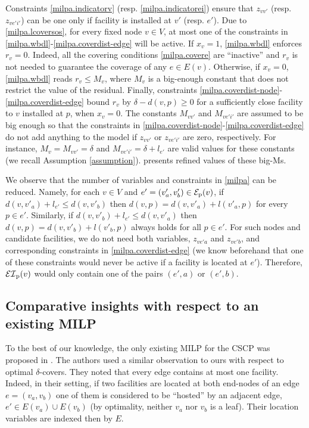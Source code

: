 Constraints \eqref{milpa.indicatorv} (resp. \eqref{milpa.indicatorei}) ensure that $z_{vv'}$ (resp. $z_{ve'i'}$) can be one only if  facility  is installed at $v'$ (resp. $e'$). Due to \eqref{milpa.lcoversos}, for every fixed node $v\in V$, at most one of the constraints in \eqref{milpa.wbdl}-\eqref{milpa.coverdist-edge} will be active. If $x_{v}=1$, \eqref{milpa.wbdl} enforces $r_{v}=0$. Indeed, all the covering conditions \eqref{milpa.covere} are ``inactive'' and $r_v$ is not needed to guarantee the coverage of any $e\in E(v)$. Otherwise, if $x_{v}=0$,  \eqref{milpa.wbdl} reads $r_{v}\leq M_v$, where $M_v$ is a big-enough constant that does not restrict the value of the residual.
Finally, constraints \eqref{milpa.coverdist-node}-\eqref{milpa.coverdist-edge} bound $r_v$ by $\delta-d(v,p)\geq 0$ for a sufficiently close facility to $v$ installed at $p$, when $x_v=0$. The constants $M_{vv'}$ and $M_{ve'i'}$ are assumed to be big enough so that the constraints in \eqref{milpa.coverdist-node}-\eqref{milpa.coverdist-edge} do not add anything to the model if $z_{vv'}$ or $z_{ve'i'}$ are zero, respectively. For instance, $M_v=M_{vv'}=\delta$ and $M_{ve'i'}=\delta+l_{e'}$ are valid values for these constants (we recall Assumption \ref{assumption}).   presents refined values of these big-Ms.

We observe that the number of variables and constraints in \eqref{milpa} can be reduced. Namely, for each $v\in V$ and $e'=(v'_a,v'_b)\in{\mathcal E}_{\mathrm{p}}(v)$, if $d(v,v'_a)+l_{e'}\leq d(v,v'_b)$ then $d(v,p)=d(v, v'_{a})+l(v'_a,p)$ for every $p\in e'$. Similarly, if $d(v,v'_b)+l_{e'}\leq d(v,v'_a)$ then $d(v,p)=d(v, v'_{b})+l(v'_b,p)$ always holds for all $p\in e'$. For such nodes and candidate facilities, we do not need both variables, $z_{ve'a}$ and $z_{ve'b}$, and corresponding constraints in  \eqref{milpa.coverdist-edge} (we know beforehand that one of these constraints would never be active if a facility is located at $e'$). Therefore, ${\mathcal {EI}}_{\mathrm{p}}(v)$ would only contain one of the pairs $(e',a)$ or $(e',b)$.



\subsection{Comparative insights with respect to an existing MILP}\label{sec:comp}
To the best of our knowledge, the only existing MILP for the CSCP was proposed in \cite{Hamacher20}. The authors used a similar observation to ours with respect to optimal $\delta$-covers. They noted that every edge contains at most one facility. Indeed, in their setting,  if two facilities are located at both end-nodes of an edge $e=(v_a,v_b)$ one of them is considered to be ``hosted'' by an adjacent edge, $e'\in E(v_a)\cup E(v_b)$ (by optimality, neither $v_a$ nor $v_b$ is a leaf). Their location variables are indexed then by $E$.



